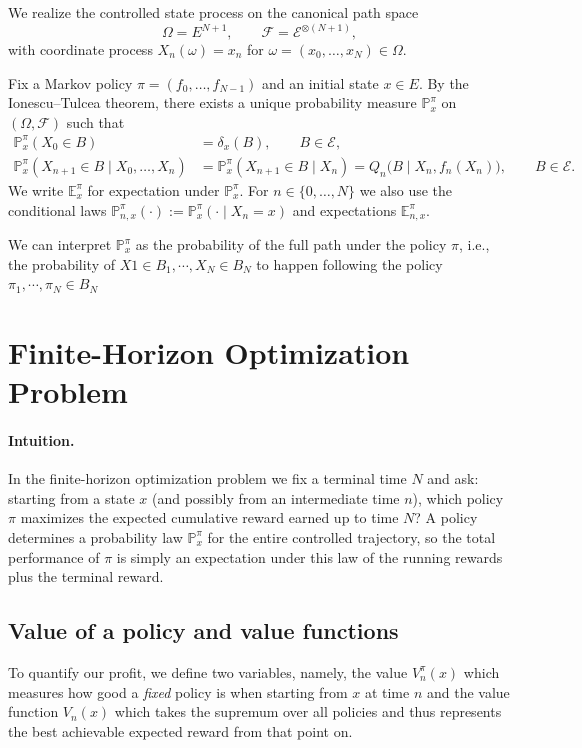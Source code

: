 We realize the controlled state process on the canonical path space
\[
\Omega = E^{N+1},\qquad \mathcal{F}=\mathcal{E}^{\otimes(N+1)},
\]
with coordinate process $X_n(\omega)=x_n$ for $\omega=(x_0,\dots,x_N)\in\Omega$.

Fix a Markov policy $\pi=(f_0,\dots,f_{N-1})$ and an initial state $x\in E$.
By the Ionescu--Tulcea theorem, there exists a unique probability measure $\mathbb{P}_x^\pi$ on $(\Omega,\mathcal{F})$ such that
\begin{align*}
\mathbb{P}_x^\pi(X_0\in B) &= \delta_x(B),\qquad B\in\mathcal{E},\\
\mathbb{P}_x^\pi(X_{n+1}\in B\mid X_0,\dots,X_n) &= \mathbb{P}_x^\pi(X_{n+1}\in B\mid X_n)
= Q_n\big(B\mid X_n,f_n(X_n)\big),\qquad B\in\mathcal{E}.
\end{align*}
We write $\mathbb{E}_x^\pi$ for expectation under $\mathbb{P}_x^\pi$. For $n\in\{0,\dots,N\}$ we also use the conditional laws $\mathbb{P}_{n,x}^\pi(\cdot):=\mathbb{P}_x^\pi(\cdot\mid X_n=x)$ and expectations $\mathbb{E}_{n,x}^\pi$.

We can interpret $\mathbb{P}_{x}^\pi$ as the probability of the full path under the policy $\pi$, i.e., the probability of ${X1\in B_1,\cdots,X_N \in B_N}$ to happen following the policy ${\pi_1,\cdots,\pi_N \in B_N}$

\section{Finite-Horizon Optimization Problem}
\paragraph{Intuition.} In the finite-horizon optimization problem we fix a terminal time $N$ and ask: starting from a state $x$ (and possibly from an intermediate time $n$), which policy $\pi$ maximizes the expected cumulative reward earned up to time $N$? A policy determines a probability law $\mathbb{P}_x^\pi$ for the entire controlled trajectory, so the total performance of $\pi$ is simply an expectation under this law of the running rewards plus the terminal reward. 

\subsection{Value of a policy and value functions}
To quantify our profit, we define two variables, namely, the value $V_n^\pi(x)$ which measures how good a \emph{fixed} policy is when starting from $x$ at time $n$ and the value function $V_n(x)$ which takes the supremum over all policies and thus represents the best achievable expected reward from that point on. 

